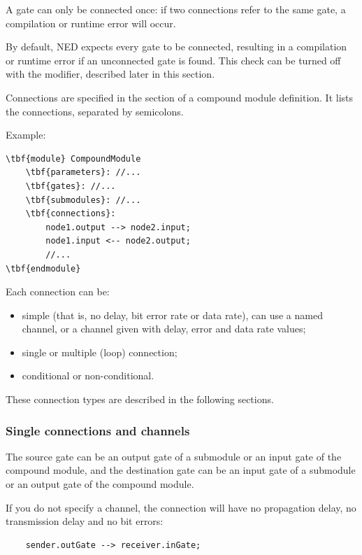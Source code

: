 A gate can only be connected once: if two connections refer to
the same gate, a compilation or runtime error will occur.

By default, NED expects every gate to be connected, resulting in
a compilation or runtime error if an unconnected gate is found.
This check can be turned off with the  modifier,
described later in this section.

Connections are specified in the
 section of a compound
module definition. It lists the connections, separated by semicolons.

Example:

\begin{Verbatim}[commandchars=\\\{\}]
\tbf{module} CompoundModule
    \tbf{parameters}: //...
    \tbf{gates}: //...
    \tbf{submodules}: //...
    \tbf{connections}:
        node1.output --> node2.input;
        node1.input <-- node2.output;
        //...
\tbf{endmodule}
\end{Verbatim}


Each connection can be:
\begin{itemize}
  \item{simple (that is, no delay, bit error rate or data rate), can
    use a named channel, or a channel given with delay, error and
    data rate values;}
\item{single or multiple (loop) connection;}
\item{conditional or non-conditional.}
\end{itemize}

These connection types are described in the following sections.


\subsubsection{Single connections and channels}


The source gate can be an output gate of a submodule or an input
gate of the compound module, and the destination gate can be
an input gate of a submodule or an output gate of the compound
module.


If you do not specify a channel, the connection will have
no propagation delay, no transmission delay and no bit errors:
\begin{verbatim}
    sender.outGate --> receiver.inGate;
\end{verbatim}

